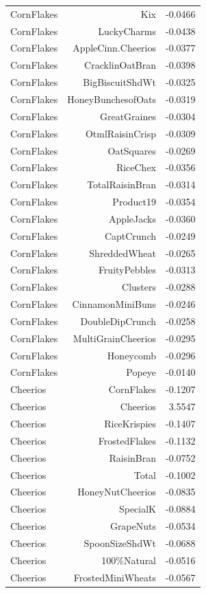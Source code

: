 \begin{longtable}{@{}lrr@{}}
CornFlakes & Kix & -0.0466 \\
CornFlakes & LuckyCharms & -0.0438 \\
CornFlakes & AppleCinn.Cheerios & -0.0377 \\
CornFlakes & CracklinOatBran & -0.0398 \\
CornFlakes & BigBiscuitShdWt & -0.0325 \\
CornFlakes & HoneyBunchesofOats & -0.0319 \\
CornFlakes & GreatGraines & -0.0304 \\
CornFlakes & OtmlRaisinCrisp & -0.0309 \\
CornFlakes & OatSquares & -0.0269 \\
CornFlakes & RiceChex & -0.0356 \\
CornFlakes & TotalRaisinBran & -0.0314 \\
CornFlakes & Product19 & -0.0354 \\
CornFlakes & AppleJacks & -0.0360 \\
CornFlakes & CaptCrunch & -0.0249 \\
CornFlakes & ShreddedWheat & -0.0265 \\
CornFlakes & FruityPebbles & -0.0313 \\
CornFlakes & Clusters & -0.0288 \\
CornFlakes & CinnamonMiniBuns & -0.0246 \\
CornFlakes & DoubleDipCrunch & -0.0258 \\
CornFlakes & MultiGrainCheerios & -0.0295 \\
CornFlakes & Honeycomb & -0.0296 \\
CornFlakes & Popeye & -0.0140 \\
Cheerios & CornFlakes & -0.1207 \\
Cheerios & Cheerios & 3.5547 \\
Cheerios & RiceKrispies & -0.1407 \\
Cheerios & FrostedFlakes & -0.1132 \\
Cheerios & RaisinBran & -0.0752 \\
Cheerios & Total & -0.1002 \\
Cheerios & HoneyNutCheerios & -0.0835 \\
Cheerios & SpecialK & -0.0884 \\
Cheerios & GrapeNuts & -0.0534 \\
Cheerios & SpoonSizeShdWt & -0.0688 \\
Cheerios & 100\%Natural & -0.0516 \\
Cheerios & FrostedMiniWheats & -0.0567 \\

\end{longtable}

